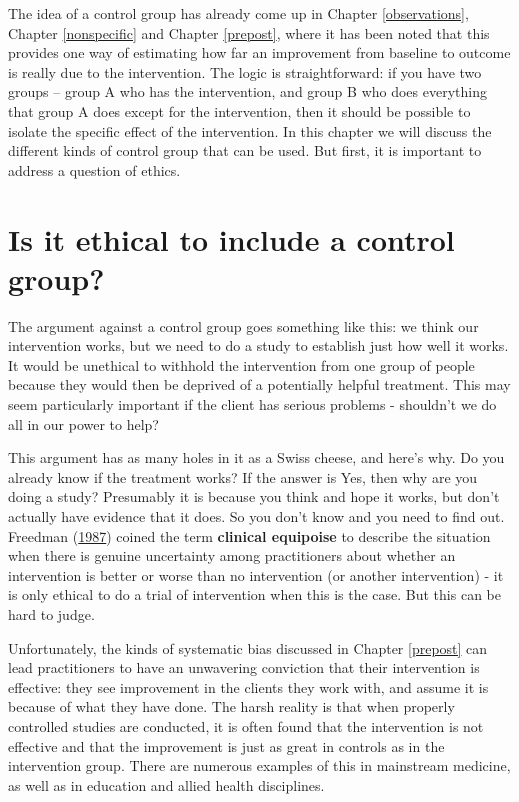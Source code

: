 \documentclass{krantz}
\begin{document}
The idea of a control group has already come up in Chapter \ref{observations}, Chapter \ref{nonspecific} and Chapter \ref{prepost}, where it has been noted that this provides one way of estimating how far an improvement from baseline to outcome is really due to the intervention. The logic is straightforward: if you have two groups -- group A who has the intervention, and group B who does everything that group A does except for the intervention, then it should be possible to isolate the specific effect of the intervention. In this chapter we will discuss the different kinds of control group that can be used. But first, it is important to address a question of ethics.

\hypertarget{is-it-ethical-to-include-a-control-group}{%
\section{Is it ethical to include a control group?}\label{is-it-ethical-to-include-a-control-group}}

The argument against a control group goes something like this: we think our intervention works, but we need to do a study to establish just how well it works. It would be unethical to withhold the intervention from one group of people because they would then be deprived of a potentially helpful treatment. This may seem particularly important if the client has serious problems - shouldn't we do all in our power to help?

This argument has as many holes in it as a Swiss cheese, and here's why. Do you already know if the treatment works? If the answer is Yes, then why are you doing a study? Presumably it is because you think and hope it works, but don't actually have evidence that it does. So you don't know and you need to find out. Freedman (\protect\hyperlink{ref-freedman1987}{1987}) coined the term \textbf{clinical equipoise}  to describe the situation when there is genuine uncertainty among practitioners about whether an intervention is better or worse than no intervention (or another intervention) - it is only ethical to do a trial of intervention when this is the case. But this can be hard to judge.

Unfortunately, the kinds of systematic bias discussed in Chapter \ref{prepost} can lead practitioners to have an unwavering conviction that their intervention is effective: they see improvement in the clients they work with, and assume it is because of what they have done. The harsh reality is that when properly controlled studies are conducted, it is often found that the intervention is not effective and that the improvement is just as great in controls as in the intervention group. There are numerous examples of this in mainstream medicine, as well as in education and allied health disciplines.
\end{document}
